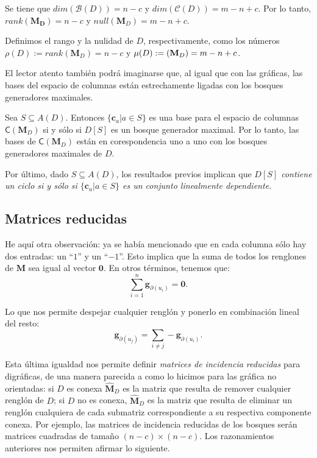  \begin{teo}
 Se tiene que $dim(\mathcal{B}(D)) = n - c$ y $dim(\mathcal{C}(D)) = m - n + c$. Por lo tanto, $rank(\mathbf{M_{D}}) = n - c$ y $null(\mathbf{M}_{D}) = m - n + c$.
 \end{teo}
 
 Definimos el rango y la nulidad de $D$, respectivamente, como los números $\rho(D):=rank(\mathbf{M}_{D}) = n -c$  y $\mu(D):=\null(\mathbf{M}_{D}) = m - n + c$.
 
 El lector atento también podrá imaginarse que, al igual que con las gráficas, las bases del espacio de columnas están estrechamente ligadas con los bosques generadores maximales.
 
\begin{cor} Sea $S\subseteq A(D)$. Entonces $\{\mathbf{c}_{a} | a \in S \}$ es una base para el espacio de columnas $\mathsf{C}(\mathbf{M}_{D})$ si y sólo si $D[S]$ es un bosque generador maximal. Por lo tanto, las bases de $\mathsf{C}(\mathbf{M}_{D})$ están en corespondencia uno a uno con los bosques generadores maximales de $D$.
\end{cor} 

Por último, dado $S \subseteq A(D)$, los resultados previos implican que \textit{$D[S]$ contiene un ciclo si y sólo si $\{\mathbf{c}_{a} | a \in S\}$ es un conjunto linealmente dependiente.} 

\subsection{Matrices reducidas}

He aquí otra observación: ya se había mencionado que en cada columna sólo hay dos entradas: un ``$1$'' y un ``$-1$''. Esto implica que la suma de todos los renglones de $\mathbf{M}$ sea igual al vector $\mathbf{0}$. En otros términos, tenemos que:
$$
\sum_{i = 1}^{n} \mathbf{g}_{\partial(u_{i})} = \mathbf{0}.
$$

Lo que nos permite despejar cualquier renglón y ponerlo en combinación lineal del resto:
$$
\mathbf{g}_{\partial(u_{j})} = \sum_{i \neq j} -\mathbf{g}_{\partial(u_{i})}.
$$

Esta última igualdad nos permite definir \textit{matrices de incidencia reducidas} para digráficas, de una manera parecida a como lo hicimos para las gráfica no orientadas: si $D$ es conexa $\widehat{\mathbf{M}}_{D}$ es la matriz que resulta de remover cualquier renglón de $D$; si $D$ no es conexa, $\widehat{\mathbf{M}}_{D}$ es la matriz que resulta de eliminar un renglón cualquiera de cada submatriz correspondiente a su respectiva componente conexa. Por ejemplo, las matrices de incidencia reducidas de los bosques serán matrices cuadradas de tamaño $(n - c) \times (n - c)$. Los razonamientos anteriores nos permiten afirmar lo siguiente.

